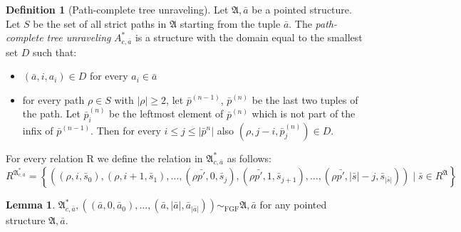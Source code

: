 \documentclass[draft]{scrartcl}
\theoremstyle{definition}
\newtheorem{definition}[theorem]{Definition}
\newtheorem{lemma}[theorem]{Lemma}
\begin{document}
\begin{definition}[Path-complete tree unraveling]
  Let $\mathfrak{A}, \bar{a}$ be a pointed structure.
  Let $S$ be the set of all strict paths in $\mathfrak{A}$ starting from the tuple $\bar{a}$.
  The \emph{path-complete tree unraveling} $A^{*}_{c,\bar{a}}$ is a structure with the domain equal to the smallest set $D$ such that:

  \begin{itemize}
    \item $(\bar{a}, i, a_{i}) \in D$ for every $a_{i} \in \bar{a}$
    \item
          for every path $\rho \in S$ with $|\rho| \geq 2$, let $\bar{p}^{(n-1)}$, $\bar{p}^{(n)}$ be the last two tuples of the path.
          Let $\bar{p}^{(n)}_{i}$ be the leftmost element of $\bar{p}^{(n)}$ which is not part of the infix of  $\bar{p}^{(n-1)}$.
          Then for every $i \leq j \leq |\bar{p}^{n}|$ also $ (\rho, j-i, \bar{p}^{(n)}_{j}) \in D$.
  \end{itemize}

  For every relation R we define the relation in $\mathfrak{A}^{*}_{c,\bar{a}}$ as follows:
  \[
    R^{\mathfrak{A}^{*}_{c,\bar{a}}} = \left\{
      (
      (\rho, i, \bar{s}_{0}),
      (\rho, i+1, \bar{s}_{1}),
      \ldots,
      (\rho \bar{p'}, 0, \bar{s}_{j}),
      (\rho \bar{p'}, 1, \bar{s}_{j+1}),
      \ldots,
      (\rho \bar{p'}, |\bar{s}|-j, \bar{s}_{|\bar{s}|})
      )
      \mid
      \bar{s} \in R^{\mathfrak{A}}
    \right\}
  \]
\end{definition}

\begin{lemma}
  $\mathfrak{A}^{*}_{c, \bar{a}}, ((\bar{a}, 0, \bar{a}_{0}), \ldots, (\bar{a}, |\bar{a}|, \bar{a}_{|\bar{a}|})) \sim_{\textrm{FGF}} \mathfrak{A}, \bar{a}$ for any pointed structure $\mathfrak{A}, \bar{a}$.
\end{lemma}
\end{document}
